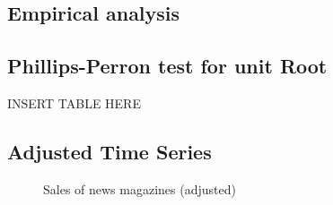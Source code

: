 \documentclass[12pt,a4paper,notitlepage]{article}
\begin{document}
\begin{appendices}

\section{Empirical analysis}

\subsection{Phillips-Perron test for unit Root}

INSERT TABLE HERE

\subsection{Adjusted Time Series}

\begin{figure}[H]
		\caption{Sales of news magazines (adjusted)}
		\centering
		\label{fig_arima_sales_fss}
\end{figure}


\end{appendices}
\end{document}
